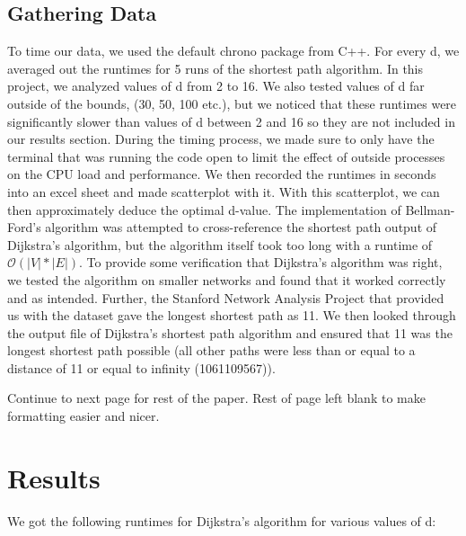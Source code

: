 \documentclass[a4paper,10pt]{article}
\begin{document}
\subsection{Gathering Data}
    To time our data, we used the default chrono package from C++. For every d, we averaged out the runtimes for 5 runs of the shortest path algorithm. In this project, we analyzed values of d from 2 to 16. We also tested values of d far outside of the bounds, (30, 50, 100 etc.), but we noticed that these runtimes were significantly slower than values of d between 2 and 16 so they are not included in our results section. During the timing process, we made sure to only have the terminal that was running the code open to limit the effect of outside processes on the CPU load and performance. We then recorded the runtimes in seconds into an excel sheet and made scatterplot with it. With this scatterplot, we can then approximately deduce the optimal d-value. \smallbreak
    The implementation of Bellman-Ford's algorithm was attempted to cross-reference the shortest path output of Dijkstra's algorithm, but the algorithm itself took too long with a runtime of $\mathcal{O}(\lvert V \rvert * \lvert E\rvert)$. To provide some verification that Dijkstra's algorithm was right, we tested the algorithm on smaller networks and found that it worked correctly and as intended. Further, the Stanford Network Analysis Project that provided us with the dataset gave the longest shortest path as 11. We then looked through the output file of Dijkstra's shortest path algorithm and ensured that 11 was the longest shortest path possible (all other paths were less than or equal to a distance of 11 or equal to infinity (1061109567)).

\bigskip
\bigskip
\bigskip

\begin{center}
    \large
    Continue to next page for rest of the paper. Rest of page left blank to make formatting easier and nicer.
\end{center}
\newpage
\section{Results}
We got the following runtimes for Dijkstra's algorithm for various values of d:
\end{document}
